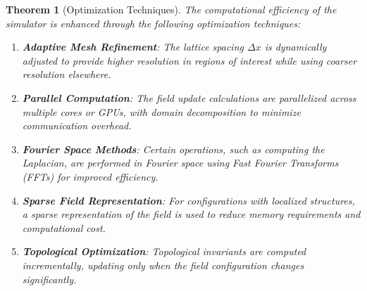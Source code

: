 \documentclass[11pt,a4paper]{article}
\newtheorem{theorem}{Theorem}[section]
\begin{document}
\begin{theorem}[Optimization Techniques]
\label{thm:optimization}
The computational efficiency of the simulator is enhanced through the following optimization techniques:
\begin{enumerate}
    \item \textbf{Adaptive Mesh Refinement}: The lattice spacing $\Delta x$ is dynamically adjusted to provide higher resolution in regions of interest while using coarser resolution elsewhere.
    
    \item \textbf{Parallel Computation}: The field update calculations are parallelized across multiple cores or GPUs, with domain decomposition to minimize communication overhead.
    
    \item \textbf{Fourier Space Methods}: Certain operations, such as computing the Laplacian, are performed in Fourier space using Fast Fourier Transforms (FFTs) for improved efficiency.
    
    \item \textbf{Sparse Field Representation}: For configurations with localized structures, a sparse representation of the field is used to reduce memory requirements and computational cost.
    
    \item \textbf{Topological Optimization}: Topological invariants are computed incrementally, updating only when the field configuration changes significantly.
\end{enumerate}
\end{theorem}
\end{document}
